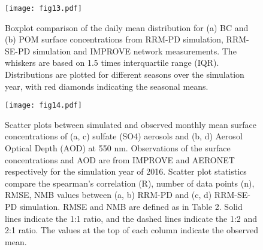 \documentclass[journal abbreviation, manuscript]{copernicus}
\begin{document}
\clearpage
\begin{figure}[t]
\texttt{[image: fig13.pdf]}
\caption{Boxplot comparison of the daily mean distribution for (a) BC and (b) POM surface concentrations from RRM-PD simulation, RRM-SE-PD simulation and IMPROVE network measurements. The whiskers are based on 1.5 times interquartile range (IQR). Distributions are plotted for different seasons over the simulation year, with red diamonds indicating the seasonal means.}
\end{figure}

\clearpage
\begin{figure}[t]
\texttt{[image: fig14.pdf]}
\caption{Scatter plots between simulated and observed monthly mean surface concentrations of (a, c) sulfate (SO4) aerosols and (b, d) Aerosol Optical Depth (AOD) at 550 nm. Observations of the surface concentrations and AOD are from IMPROVE and AERONET respectively for the simulation year of 2016. Scatter plot statistics compare the spearman’s correlation (R), number of data points (n), RMSE, NMB values between (a, b) RRM-PD and (c, d) RRM-SE-PD simulation. RMSE and NMB are defined as in Table 2. Solid lines indicate the 1:1 ratio, and the dashed lines indicate the 1:2 and 2:1 ratio. The values at the top of each column indicate the observed mean.}
\end{figure}







\end{document}
